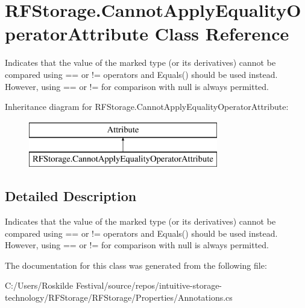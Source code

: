 \hypertarget{class_r_f_storage_1_1_cannot_apply_equality_operator_attribute}{}\section{R\+F\+Storage.\+Cannot\+Apply\+Equality\+Operator\+Attribute Class Reference}
\label{class_r_f_storage_1_1_cannot_apply_equality_operator_attribute}


Indicates that the value of the marked type (or its derivatives) cannot be compared using \textquotesingle{}==\textquotesingle{} or \textquotesingle{}!=\textquotesingle{} operators and {\ttfamily Equals()} should be used instead. However, using \textquotesingle{}==\textquotesingle{} or \textquotesingle{}!=\textquotesingle{} for comparison with {\ttfamily null} is always permitted.  


Inheritance diagram for R\+F\+Storage.\+Cannot\+Apply\+Equality\+Operator\+Attribute\+:\begin{figure}[H]
\begin{center}
\leavevmode
\includegraphics[height=2.000000cm]{class_r_f_storage_1_1_cannot_apply_equality_operator_attribute}
\end{center}
\end{figure}


\subsection{Detailed Description}
Indicates that the value of the marked type (or its derivatives) cannot be compared using \textquotesingle{}==\textquotesingle{} or \textquotesingle{}!=\textquotesingle{} operators and {\ttfamily Equals()} should be used instead. However, using \textquotesingle{}==\textquotesingle{} or \textquotesingle{}!=\textquotesingle{} for comparison with {\ttfamily null} is always permitted. 


\begin{DoxyCode}{0}
\DoxyCodeLine{[CannotApplyEqualityOperator]}
\DoxyCodeLine{}
\DoxyCodeLine{    \}}
\DoxyCodeLine{  \}}
\DoxyCodeLine{\}}
\end{DoxyCode}


The documentation for this class was generated from the following file\+:\begin{DoxyCompactItemize}
\item 
C\+:/\+Users/\+Roskilde Festival/source/repos/intuitive-\/storage-\/technology/\+R\+F\+Storage/\+R\+F\+Storage/\+Properties/Annotations.\+cs\end{DoxyCompactItemize}
